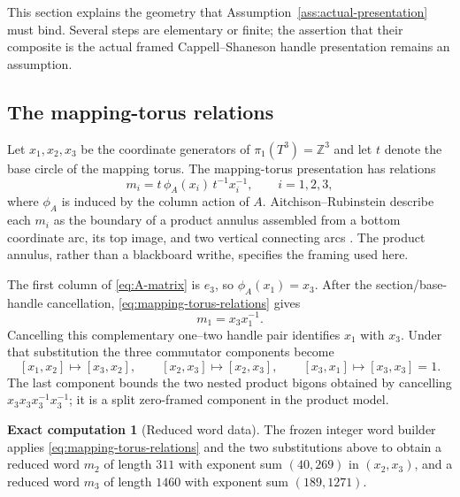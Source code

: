 \documentclass[10pt,reqno]{amsart}
\theoremstyle{definition}
\newtheorem{computation}[theorem]{Exact computation}
\theoremstyle{remark}
\newcommand{\Z}{\mathbb Z}
\begin{document}
This section explains the geometry that Assumption~\ref{ass:actual-presentation}
must bind.  Several steps are elementary or finite; the assertion that their
composite is the actual framed Cappell--Shaneson handle presentation remains
an assumption.

\subsection{The mapping-torus relations}

Let $x_1,x_2,x_3$ be the coordinate generators of
$\pi_1(T^3)=\Z^3$ and let $t$ denote the base circle of the mapping torus.
The mapping-torus presentation has relations
\begin{equation}\label{eq:mapping-torus-relations}
m_i=t\,\phi_A(x_i)\,t^{-1}x_i^{-1},\qquad i=1,2,3,
\end{equation}
where $\phi_A$ is induced by the column action of $A$.  Aitchison--Rubinstein
describe each $m_i$ as the boundary of a product annulus assembled from a
bottom coordinate arc, its top image, and two vertical connecting arcs
\cite[pp.~5--9]{AitchisonRubinstein1984}.  The product annulus, rather than a
blackboard writhe, specifies the framing used here.

The first column of \cref{eq:A-matrix} is $e_3$, so
$\phi_A(x_1)=x_3$.  After the section/base-handle cancellation,
\cref{eq:mapping-torus-relations} gives
\begin{equation}\label{eq:m1-after-first-cancel}
m_1=x_3x_1^{-1}.
\end{equation}
Cancelling this complementary one--two handle pair identifies $x_1$ with
$x_3$.  Under that substitution the three commutator components become
\begin{equation}\label{eq:commutator-substitution}
[x_1,x_2]\mapsto[x_3,x_2],\qquad
[x_2,x_3]\mapsto[x_2,x_3],\qquad
[x_3,x_1]\mapsto[x_3,x_3]=1.
\end{equation}
The last component bounds the two nested product bigons obtained by cancelling
$x_3x_3x_3^{-1}x_3^{-1}$; it is a split zero-framed component in the product
model.

\begin{computation}[Reduced word data]\label{comp:reduced-words}
The frozen integer word builder applies \cref{eq:mapping-torus-relations} and
the two substitutions above to obtain a reduced word $m_2$ of length $311$
with exponent sum $(40,269)$ in $(x_2,x_3)$, and a reduced word $m_3$ of
length $1460$ with exponent sum $(189,1271)$.
\end{computation}
\end{document}

